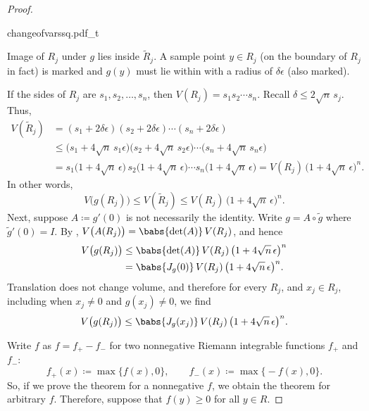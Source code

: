 \begin{proof}
\begin{myfigureht}
{changeofvarssq.pdf_t}
\caption{Image of $R_j$ under $g$ lies inside
$\widetilde{R}_j$.  A sample point $y \in R_j$ (on the boundary of $R_j$ in fact) is marked
and $g(y)$ must lie within with a radius of $\delta\epsilon$
(also marked).\label{changeofvarssq:fig}}
\end{myfigureht}


If the sides of $R_j$ are $s_1,s_2,\ldots,s_n$, then
$V(R_j) = s_1 s_2 \cdots s_n$.   Recall $\delta \leq 2\sqrt{n} \, s_j$.
Thus,
\begin{equation*}
\begin{split}
V(\widetilde{R}_j) & =
(s_1+2\delta \epsilon )
(s_2+2\delta \epsilon )
\cdots
(s_n+2\delta \epsilon )
\\
& \leq
\bigl(s_1+4 \sqrt{n}\,s_1 \epsilon \bigr)
\bigl(s_2+4 \sqrt{n}\,s_2 \epsilon \bigr)
\cdots
\bigl(s_n+4 \sqrt{n}\,s_n \epsilon \bigr)
\\
& =
s_1 \bigl(1+4 \sqrt{n}\, \epsilon \bigr)
\,
s_2 \bigl(1+4 \sqrt{n}\, \epsilon \bigr)
\cdots
s_n \bigl(1+4 \sqrt{n}\, \epsilon \bigr)
=
V(R_j) \, {\bigl(1+4\sqrt{n} \, \epsilon\bigr)}^n .
\end{split}
\end{equation*}
In other words,
\begin{equation*}
V\bigl(g(R_j)\bigr) \leq V(\widetilde{R}_j) \leq V(R_j) \,
{\bigl(1+4\sqrt{n} \, \epsilon\bigr)}^n .
\end{equation*}
Next, suppose $A \coloneqq g'(0)$ is not necessarily the identity.
Write $g = A \circ \widetilde{g}$ where $\widetilde{g}'(0) = I$.
By ,
$V\bigl(A(R_j)\bigr) = \babs{\det(A)} \, V(R_j)$, and hence
\begin{equation*}
\begin{split}
V\bigl(g(R_j)\bigr) & \leq
\babs{\det(A)} \, V(R_j) \,
{\bigl(1+4\sqrt{n} \, \epsilon\bigr)}^n \\
& =
\babs{J_g(0)} \, V(R_j) \,
{\bigl(1+4\sqrt{n} \, \epsilon\bigr)}^n .
\end{split}
\end{equation*}
Translation does not change volume, and therefore
for every $R_j$, and $x_j \in R_j$, including when $x_j \not= 0$ and $g(x_j)
\not= 0$, we find
\begin{equation*}
V\bigl(g(R_j)\bigr) \leq
\babs{J_g(x_j)} \, V(R_j) \,
{\bigl(1+4\sqrt{n} \, \epsilon\bigr)}^n .
\end{equation*}

Write $f$ as
$f = f_+ - f_-$ for two nonnegative Riemann integrable
functions $f_+$ and $f_-$:
\begin{equation*}
f_+(x) \coloneqq \max \bigl\{ f(x) , 0 \bigr\}, \qquad
f_-(x) \coloneqq \max \bigl\{ -f(x) , 0 \bigr\} .
\end{equation*}
So, if we prove the theorem for a nonnegative $f$,
we obtain the theorem for arbitrary $f$.
Therefore, suppose that 
$f(y) \geq 0$ for all $y \in R$.


\end{proof}
